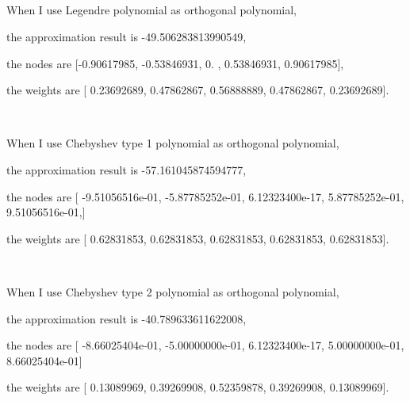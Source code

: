 \documentclass{article}
\begin{document}
	\subsection{}
		When I use Legendre polynomial as orthogonal polynomial, 
		\par
		the approximation result is -49.506283813990549,
		\par
		the nodes are [-0.90617985, -0.53846931,  0.        ,  0.53846931,  0.90617985],\par
		the weights are [ 0.23692689,  0.47862867,  0.56888889,  0.47862867,  0.23692689].
		\par
		\ 
		\par
		When I use Chebyshev type 1 polynomial as orthogonal polynomial, 
		\par
		the approximation result is -57.161045874594777,
		\par
		the nodes are [ -9.51056516e-01,  -5.87785252e-01,   6.12323400e-17,
          5.87785252e-01,   9.51056516e-01,]\par
		the weights are [ 0.62831853,  0.62831853,  0.62831853,  0.62831853,  0.62831853].
		\par
		\ 
		\par
		When I use Chebyshev type 2 polynomial as orthogonal polynomial, 
		\par
		the approximation result is -40.789633611622008,
		\par
		the nodes are [ -8.66025404e-01,  -5.00000000e-01,   6.12323400e-17,
          5.00000000e-01,   8.66025404e-01]\par
		the weights are [ 0.13089969,  0.39269908,  0.52359878,  0.39269908,  0.13089969].
		
\end{document}
